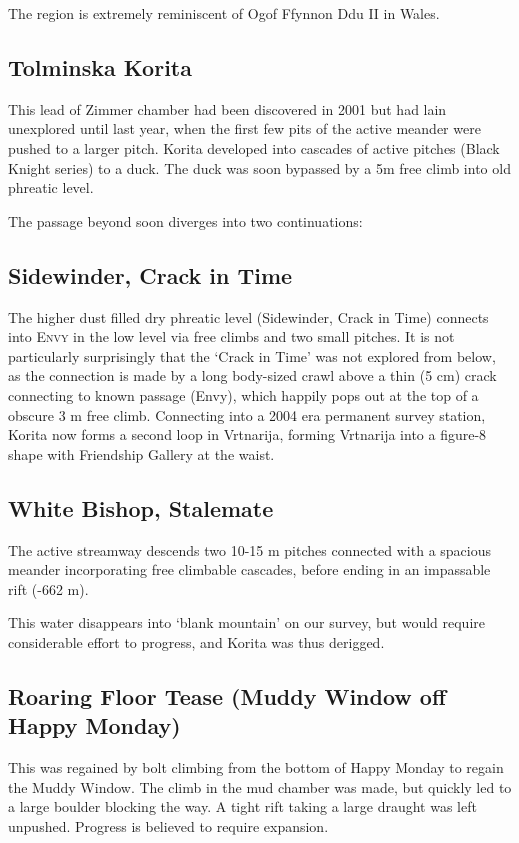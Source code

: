 The region is extremely reminiscent of Ogof Ffynnon Ddu II in Wales.


\subsection{Tolminska Korita}

This lead of Zimmer chamber had been discovered in 2001 but had lain
unexplored until last year, when the first few pits of the active
meander were pushed to a larger pitch. Korita developed into cascades
of active pitches (Black Knight series) to a duck. The duck was soon
bypassed by a 5m free climb into old phreatic level. 

The passage beyond
soon diverges into two continuations:

\subsection{Sidewinder, Crack in Time}

The higher dust filled dry phreatic level (Sidewinder, Crack in Time) connects
into \textsc{Envy} in the low level via free climbs and two small pitches. It
is not particularly surprisingly that the `Crack in Time' was not explored from
below, as the connection is made by a long body-sized crawl above a thin (5 cm)
crack connecting to known passage (Envy), which happily pops out at the top of
a obscure 3 m free climb. Connecting into a 2004 era permanent survey station,
Korita now forms a second loop in Vrtnarija, forming Vrtnarija into a figure-8
shape with Friendship Gallery at the waist.

\subsection{White Bishop, Stalemate}

The active streamway descends 
two 10-15 m pitches connected with a spacious meander incorporating free
climbable cascades, before ending in an impassable rift (-662 m). 

This water disappears into `blank mountain' on
our survey, but would require considerable effort to progress, and Korita
was thus derigged.

\subsection{Roaring Floor Tease (Muddy Window off Happy Monday)}

This was regained by bolt climbing from the bottom of Happy Monday to regain the Muddy Window. 
The climb in the mud chamber was made, but quickly led to a large boulder
blocking the way. A tight rift taking a large draught was left unpushed.
Progress is believed to require expansion.

